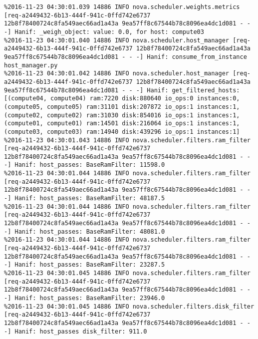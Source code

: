 \begin{lstlisting}[frame=single, caption={The filter scheduler log trace for 10 virtual instances}, label={lst:filterschedulercodetracelog10vi}, escapechar=|]
%2016-11-23 04:30:01.039 14886 INFO nova.scheduler.weights.metrics [req-a2449432-6b13-444f-941c-0ffd742e6737 12b8f78400724c8fa549aec66ad1a43a 9ea57ff8c67544b78c8096ea4dc1d081 - - -] Hanif: _weigh_object: value: 0.0, for host: compute01
%2016-11-23 04:30:01.039 14886 INFO nova.scheduler.weights.metrics [req-a2449432-6b13-444f-941c-0ffd742e6737 12b8f78400724c8fa549aec66ad1a43a 9ea57ff8c67544b78c8096ea4dc1d081 - - -] Hanif: _weigh_object: value: 0.0, for host: compute03
%2016-11-23 04:30:01.040 14886 INFO nova.scheduler.host_manager [req-a2449432-6b13-444f-941c-0ffd742e6737 12b8f78400724c8fa549aec66ad1a43a 9ea57ff8c67544b78c8096ea4dc1d081 - - -] Hanif: consume_from_instance host_manager.py
%2016-11-23 04:30:01.042 14886 INFO nova.scheduler.host_manager [req-a2449432-6b13-444f-941c-0ffd742e6737 12b8f78400724c8fa549aec66ad1a43a 9ea57ff8c67544b78c8096ea4dc1d081 - - -] Hanif: get_filtered_hosts: [(compute04, compute04) ram:7220 disk:880640 io_ops:0 instances:0, (compute05, compute05) ram:31101 disk:207872 io_ops:1 instances:1, (compute02, compute02) ram:31030 disk:854016 io_ops:1 instances:1, (compute01, compute01) ram:14501 disk:216064 io_ops:1 instances:1, (compute03, compute03) ram:14940 disk:439296 io_ops:1 instances:1]
%2016-11-23 04:30:01.043 14886 INFO nova.scheduler.filters.ram_filter [req-a2449432-6b13-444f-941c-0ffd742e6737 12b8f78400724c8fa549aec66ad1a43a 9ea57ff8c67544b78c8096ea4dc1d081 - - -] Hanif: host_passes: BaseRamFilter: 11598.0
%2016-11-23 04:30:01.044 14886 INFO nova.scheduler.filters.ram_filter [req-a2449432-6b13-444f-941c-0ffd742e6737 12b8f78400724c8fa549aec66ad1a43a 9ea57ff8c67544b78c8096ea4dc1d081 - - -] Hanif: host_passes: BaseRamFilter: 48187.5
%2016-11-23 04:30:01.044 14886 INFO nova.scheduler.filters.ram_filter [req-a2449432-6b13-444f-941c-0ffd742e6737 12b8f78400724c8fa549aec66ad1a43a 9ea57ff8c67544b78c8096ea4dc1d081 - - -] Hanif: host_passes: BaseRamFilter: 48081.0
%2016-11-23 04:30:01.044 14886 INFO nova.scheduler.filters.ram_filter [req-a2449432-6b13-444f-941c-0ffd742e6737 12b8f78400724c8fa549aec66ad1a43a 9ea57ff8c67544b78c8096ea4dc1d081 - - -] Hanif: host_passes: BaseRamFilter: 23287.5
%2016-11-23 04:30:01.045 14886 INFO nova.scheduler.filters.ram_filter [req-a2449432-6b13-444f-941c-0ffd742e6737 12b8f78400724c8fa549aec66ad1a43a 9ea57ff8c67544b78c8096ea4dc1d081 - - -] Hanif: host_passes: BaseRamFilter: 23946.0
%2016-11-23 04:30:01.045 14886 INFO nova.scheduler.filters.disk_filter [req-a2449432-6b13-444f-941c-0ffd742e6737 12b8f78400724c8fa549aec66ad1a43a 9ea57ff8c67544b78c8096ea4dc1d081 - - -] Hanif: host_passes disk_filter: 911.0

\end{lstlisting}
